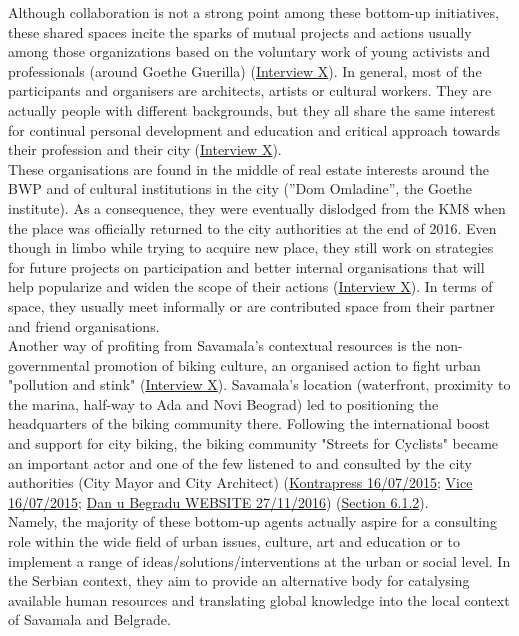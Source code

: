 \documentclass[11pt]{report}
\begin{document}
{{{{Although collaboration is not a strong point among these bottom-up initiatives, these shared spaces incite the sparks of mutual projects and actions usually among those organizations based on the voluntary work of young activists and professionals (around Goethe Guerilla) (\href{InterviewX}{Interview X}).
In general, most of the participants and organisers are architects, artists or cultural workers. They are actually people with different backgrounds, but they all share the same interest for continual personal development and education and critical approach towards their profession and their city (\href{InterviewX}{Interview X}).
\\

These organisations are found in the middle of real estate interests around the BWP and of cultural institutions in the city (”Dom Omladine”, the Goethe institute). As a consequence, they were eventually dislodged from the KM8 when the place was officially returned to the city authorities at the end of 2016. Even though in limbo while trying to acquire new place, they still work on strategies for future projects on participation and better internal organisations that will help popularize and widen the scope of their actions (\href{InterviewX}{Interview X}).
In terms of space, they usually meet informally or are contributed space from their partner and friend organisations.
\\

Another way of profiting from Savamala's contextual resources is the non-governmental promotion of biking culture, an organised action to fight urban "pollution and stink"
(\href{InterviewX}{Interview X}).
Savamala's location (waterfront, proximity to the marina, half-way to Ada and Novi Beograd) led to positioning the headquarters of the biking community there. 
Following the international boost and support for city biking, the biking community "Streets for Cyclists" became an important actor and one of the few listened to and consulted by the city authorities (City Mayor and City Architect) (\href{Kontrapress protest zbog blokade}{Kontrapress 16/07/2015}}; \href{vice}{Vice 16/07/2015}; \href{danubeograd}{Dan u Begradu WEBSITE 27/11/2016}) (\href{Section 6.1.2}{Section 6.1.2}).
\\

Namely, the majority of these bottom-up agents actually aspire for a consulting role within the wide field of urban issues, culture, art and education or to implement a range of ideas/solutions/interventions at the urban or social level. In the Serbian context, they aim to provide an alternative body for catalysing available human resources and translating global knowledge into the local context of Savamala and Belgrade.

}}}
\end{document}
